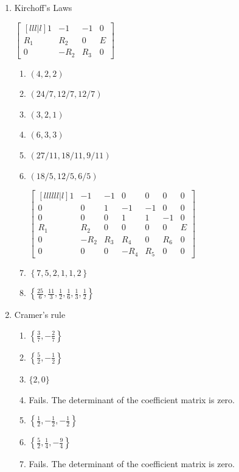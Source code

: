 {\begin{multicols}{2}
\begin{enumerate}
\item Kirchoff's Laws

 $\begin{bmatrix}[lll|l]
 1 & -1 & -1 & 0 \\
 R_1 & R_2 & 0 & E \\
 0 & -R_2 & R_3 & 0
\end{bmatrix}$

\begin{enumerate}
\item $(4,2,2)$
\item $(24/7,12/7,12/7)$
\item $(3,2,1)$
\item $(6,3,3)$
\item $(27/11,18/11,9/11)$
\item $(18/5,12/5,6/5)$

$\begin{bmatrix}[llllll|l]
 1 & -1 & -1 & 0 & 0 & 0 & 0 \\
 0 & 0 & 1 & -1 & -1 & 0 & 0 \\
 0 & 0 & 0 & 1 & 1 & -1 & 0 \\
 R_1 & R_2 & 0 & 0 & 0 & 0 & E \\
 0 & -R_2 & R_3 & R_4 & 0 & R_6 & 0 \\
 0 & 0 & 0 & -R_4 & R_5 & 0 & 0
\end{bmatrix}$

\item $\left\{7, 5, 2, 1, 1, 2\right\}$

\item $\left\{\frac{25}{6},\frac{11}{3},\frac{1}{2},\frac{1}{6},\frac{1}{3},\frac{1}{2}\right\}$
\end{enumerate}


\item Cramer's rule
\begin{enumerate}
\item $\left\{\frac{3}{7},-\frac{2}{7}\right\}$
\item $\left\{\frac{5}{2},-\frac{1}{2}\right\}$
\item $\{2,0\}$
\item Fails. The determinant of the coefficient matrix is zero.
\item $\left\{\frac{1}{2},-\frac{1}{2},-\frac{1}{2}\right\}$
\item $\left\{\frac{5}{2},\frac{1}{4},-\frac{9}{4}\right\}$
\item Fails. The determinant of the coefficient matrix is zero.
\end{enumerate}






\end{enumerate}
\end{multicols}}
